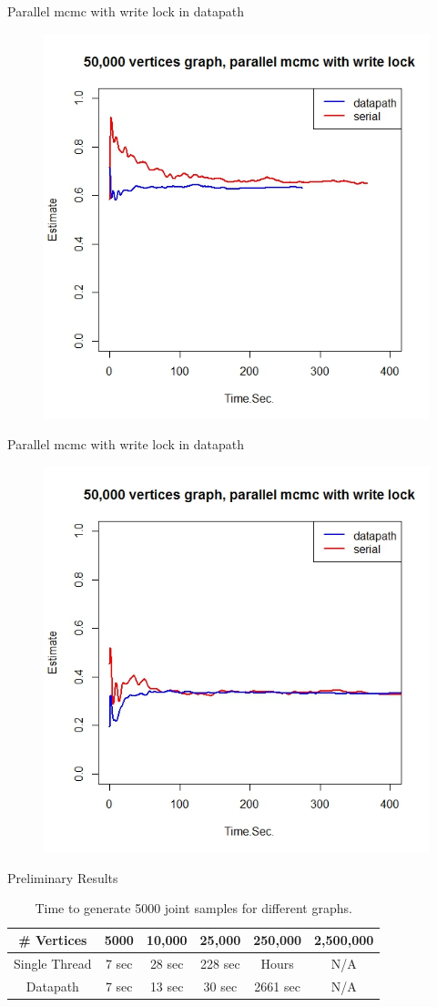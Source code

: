 \documentclass[onlymath,xcolor=pdftex,dvipsnames,table]{beamer}
\begin{document}
\begin{frame}{Parallel mcmc with write lock in datapath}
\begin{figure}
  \centering
  \includegraphics[width=.6\textwidth]{R1.jpeg}
\end{figure}
\end{frame}


\begin{frame}{Parallel mcmc with write lock in datapath}
\begin{figure}
  \centering
  \includegraphics[width=.6\textwidth]{R3.jpeg}
\end{figure}
\end{frame}


\begin{frame}{Preliminary Results}
\begin{table}[h]
  \centering
  \begin{tabular}{cccccc}\toprule
    \# Vertices & 5000	& 10,000 & 25,000 & 250,000 & 2,500,000\\\midrule
       Single Thread & 7 sec & 28 sec & 228 sec & Hours	& N/A\\
       Datapath & 7 sec & 13 sec & 30 sec & 2661 sec & N/A\\
     \bottomrule
  \end{tabular}
  \caption{Time to generate 5000 joint samples for different graphs.}
\end{table}
\end{frame}
\end{document}

